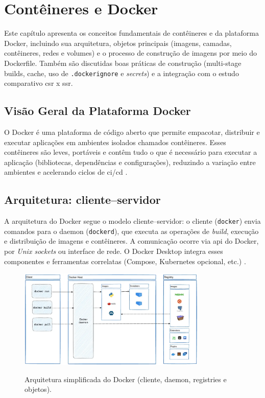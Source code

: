 \section{Contêineres e Docker}
\label{cap:docker}

Este capítulo apresenta os conceitos fundamentais de contêineres e da plataforma Docker, incluindo sua arquitetura, objetos principais (imagens, camadas, contêineres, redes e volumes) e o processo de construção de imagens por meio do Dockerfile. Também são discutidas boas práticas de construção (multi-stage builds, cache, uso de \texttt{.dockerignore} e \textit{secrets}) e a integração com o estudo comparativo \acrshort{csr} x \acrshort{ssr}. \cite{docker_overview,dockerfile_ref} 

\subsection{Visão Geral da Plataforma Docker}
\label{sec:docker-overview}

O Docker é uma plataforma de código aberto que permite empacotar, distribuir e executar aplicações em ambientes isolados chamados contêineres. Esses contêineres são leves, portáveis e contêm tudo o que é necessário para executar a aplicação (bibliotecas, dependências e configurações), reduzindo a variação entre ambientes e acelerando ciclos de \acrshort{ci}/\acrshort{cd} \cite{docker_overview}. 

\subsection{Arquitetura: cliente–servidor}
\label{subsec:docker-arquitetura}

A arquitetura do Docker segue o modelo cliente–servidor: o cliente (\texttt{docker}) envia comandos para o daemon (\texttt{dockerd}), que executa as operações de \textit{build}, execução e distribuição de imagens e contêineres. A comunicação ocorre via \acrshort{api} do Docker, por \textit{Unix sockets} ou interface de rede. O Docker Desktop integra esses componentes e ferramentas correlatas (Compose, Kubernetes opcional, etc.) \cite{docker_overview}. 

\begin{figure}[H]
  \centering
  \caption{Arquitetura simplificada do Docker (cliente, daemon, registries e objetos).}
  \includegraphics[width=0.8\textwidth]{media/docker_architecture.png}
  \label{fig:docker-arquitetura}
\end{figure}

